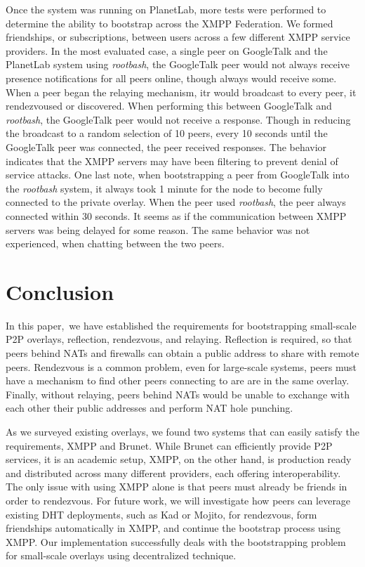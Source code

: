 \documentclass[conference]{IEEEtran}
\begin{document}
Once the system was running on PlanetLab, more tests were performed to
determine the ability to bootstrap across the XMPP Federation.  We formed
friendships, or subscriptions, between users across a few different XMPP
service providers.  In the most evaluated case, a single peer on GoogleTalk and
the PlanetLab system using \textit{rootbash}, the GoogleTalk peer would not
always receive presence notifications for all peers online, though always would
receive some.  When a peer began the relaying mechanism, itr would broadcast to
every peer, it rendezvoused or discovered.  When performing this between
GoogleTalk and \textit{rootbash}, the GoogleTalk peer would not receive a
response.  Though in reducing the broadcast to a random selection of 10 peers,
every 10 seconds until the GoogleTalk peer was connected, the peer received
responses.  The behavior indicates that the XMPP servers may have been
filtering to prevent denial of service attacks.  One last note, when
bootstrapping a peer from GoogleTalk into the \textit{rootbash} system, it
always took 1 minute for the node to become fully connected to the private
overlay.  When the peer used \textit{rootbash}, the peer always connected
within 30 seconds.  It seems as if the communication between XMPP servers was
being delayed for some reason.  The same behavior was not experienced, when
chatting between the two peers.

\section{Conclusion}
\label{conclusions}

In this paper, we have established the requirements for bootstrapping small-scale
P2P overlays, reflection, rendezvous, and relaying.  Reflection is required, so
that peers behind NATs and firewalls can obtain a public address to share with
remote peers.  Rendezvous is a common problem, even for large-scale systems,
peers must have a mechanism to find other peers connecting to are are in the
same overlay.  Finally, without relaying, peers behind NATs would be unable to
exchange with each other their public addresses and perform NAT hole punching.

As we surveyed existing overlays, we found two systems that can easily satisfy
the requirements, XMPP and Brunet.  While Brunet can efficiently provide P2P
services, it is an academic setup, XMPP, on the other hand, is production ready
and distributed across many different providers, each offering
interoperability.  The only issue with using XMPP alone is that peers must
already be friends in order to rendezvous.  For future work, we will
investigate how peers can leverage existing DHT deployments, such as Kad or
Mojito, for rendezvous, form friendships automatically in XMPP, and continue
the bootstrap process using XMPP.  Our implementation successfully deals with
the bootstrapping problem for small-scale overlays using decentralized
technique.




\suppressfloats
\end{document}
